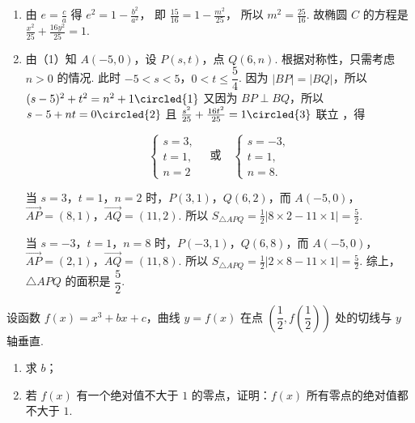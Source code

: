 \begin{solution}
\begin{enumerate}
\item 由
\(e=\frac{c}{a}\)
得
\(e^2=1-\frac{b^2}{a^2}\)，
即
\(\frac{15}{16}=1-\frac{m^2}{25}\)，
所以
\(m^2=\frac{25}{16}\).
故椭圆 \(C\) 的方程是
\(\frac{x^2}{25}+\frac{16y^2}{25}=1\).

\item 由（1）知 \(A(-5,0)\)，设 \(P(s,t)\)，点 \(Q(6,n)\).
根据对称性，只需考虑 \(n>0\) 的情况. 此时 \(-5<s<5\)，\(0<t\le \dfrac{5}{4}\).
因为 \(|BP|=|BQ|\)，所以
\((s-5)^2+t^2=n^2+1 \circled{1}\)
又因为 \(BP\perp BQ\)，所以
\(s-5+nt=0 \circled{2}\)
且
\(\frac{s^2}{25}+\frac{16t^2}{25}=1 \circled{3}\)
联立 ，得

\[
\begin{cases}
s=3,\\
t=1,\\
n=2
\end{cases}
\quad\text{或}\quad
\begin{cases}
s=-3,\\
t=1,\\
n=8.
\end{cases}
\]

当 \(s=3\)，\(t=1\)，\(n=2\) 时，\(P(3,1)\)，\(Q(6,2)\)，而 \(A(-5,0)\)，
\(\overrightarrow{AP}=(8,1)\)，\(\overrightarrow{AQ}=(11,2)\).
所以
\(S_{\triangle APQ}=\frac{1}{2}\left| 8\times2-11\times1 \right|=\frac{5}{2}\).

当 \(s=-3\)，\(t=1\)，\(n=8\) 时，\(P(-3,1)\)，\(Q(6,8)\)，而 \(A(-5,0)\)，
\(\overrightarrow{AP}=(2,1)\)，\(\overrightarrow{AQ}=(11,8)\).
所以
\(S_{\triangle APQ}=\frac{1}{2}\left| 2\times8-11\times1 \right|=\frac{5}{2}\).
综上，\(\triangle APQ\) 的面积是 \(\dfrac{5}{2}\).
\end{enumerate}
\end{solution}

\begin{problem}
设函数 \(f(x)=x^3+bx+c\)，曲线 \(y=f(x)\) 在点 \(\left( \dfrac{1}{2},f\left( \dfrac{1}{2} \right) \right)\) 处的切线与 \(y\) 轴垂直.

\begin{enumerate}
\item 求 \(b\)；
\item 若 \(f(x)\) 有一个绝对值不大于 \(1\) 的零点，证明：\(f(x)\) 所有零点的绝对值都不大于 \(1\).
\end{enumerate}
\end{problem}


